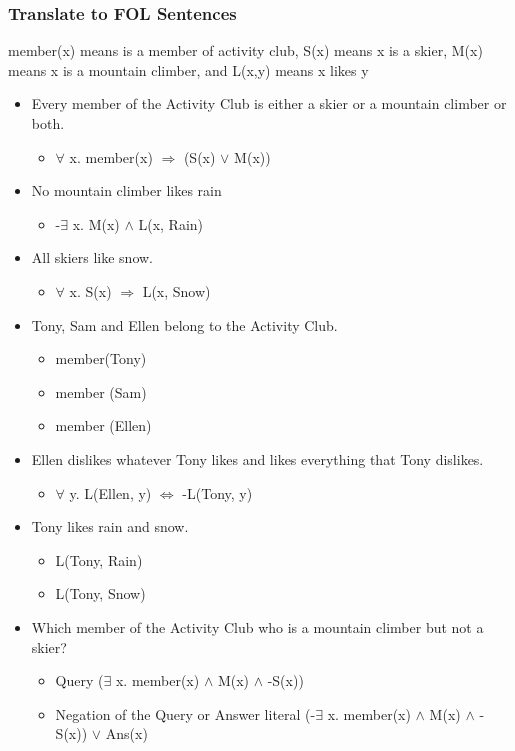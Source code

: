 \documentclass[compress, 9pt]{beamer}
\begin{document}
\begin{frame}
\frametitle{Translate to FOL Sentences}
\label{sec-4-2}

member(x) means is a member of activity club, S(x) means x is a skier, M(x) means x is a mountain climber, and L(x,y) means x likes y
\begin{itemize}
\item Every member of the Activity Club is either a skier or a mountain
  climber or both.
\begin{itemize}
\item <2-> $\forall$ x. member(x) $\Rightarrow$ (S(x) $\vee$ M(x))
\end{itemize}
\item No mountain climber likes rain
\begin{itemize}
\item <3-> -$\exists$ x. M(x) $\wedge$ L(x, Rain)
\end{itemize}
\item All skiers like snow.
\begin{itemize}
\item <4->  $\forall$ x. S(x) $\Rightarrow$ L(x, Snow)
\end{itemize}
\item Tony, Sam and Ellen belong to the Activity Club.
\begin{itemize}
\item <5-> member(Tony)
\item <5-> member (Sam)
\item <5-> member (Ellen)
\end{itemize}
\item Ellen dislikes whatever Tony likes and likes everything that Tony dislikes.
\begin{itemize}
\item <6-> $\forall$ y. L(Ellen, y) $\Leftrightarrow$ -L(Tony, y)
\end{itemize}
\item Tony likes rain and snow.
\begin{itemize}
\item <7-> L(Tony, Rain)
\item <7-> L(Tony, Snow)
\end{itemize}
\item Which member of the Activity Club who is a mountain climber but not
  a skier?
\begin{itemize}
\item <8-> Query ($\exists$ x. member(x) $\wedge$ M(x) $\wedge$ -S(x))
\item <8-> Negation of the Query or Answer literal (-$\exists$
    x. member(x) $\wedge$ M(x) $\wedge$ -S(x)) $\vee$ Ans(x)
\end{itemize}
\end{itemize}
\end{frame}
\end{document}
